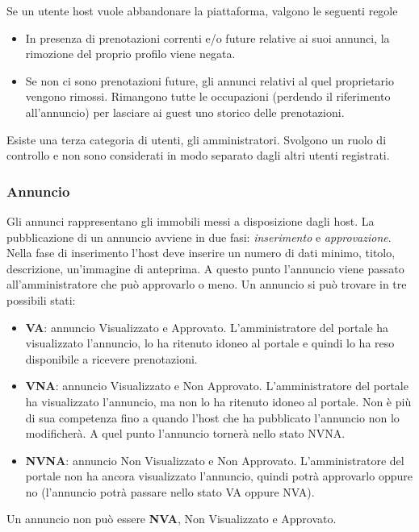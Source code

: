 \documentclass[1_relazione.tex]{subfiles}
\begin{document}
Se un utente host vuole abbandonare la piattaforma, valgono le seguenti regole 
\begin{itemize}
\item In presenza di prenotazioni correnti e/o future relative ai suoi annunci, la rimozione del proprio profilo viene negata.
\item Se non ci sono prenotazioni future, gli annunci relativi al quel proprietario vengono rimossi. Rimangono tutte le occupazioni (perdendo il riferimento all'annuncio) per lasciare ai guest uno storico delle prenotazioni.
\end{itemize}

Esiste una terza categoria di utenti, gli amministratori. Svolgono un ruolo di controllo e non sono considerati in modo separato dagli altri utenti registrati.  \\

\subsubsection{Annuncio} 
Gli annunci rappresentano gli immobili messi a disposizione dagli host. La pubblicazione di un annuncio avviene in due fasi: \textit{inserimento} e \textit{approvazione}.
Nella fase di inserimento l'host deve inserire un numero di dati minimo, titolo, descrizione, un'immagine di anteprima. A questo punto l'annuncio viene passato all'amministratore che può approvarlo o meno. Un annuncio si può trovare in tre possibili stati: 

\begin{itemize}
\item \textbf{VA}: annuncio Visualizzato e Approvato. L'amministratore del portale ha visualizzato l'annuncio, lo ha ritenuto idoneo al portale e quindi lo ha reso disponibile a ricevere prenotazioni.
\item \textbf{VNA}: annuncio Visualizzato e Non Approvato. L'amministratore del portale ha visualizzato l'annuncio, ma non lo ha ritenuto idoneo al portale. Non è più di sua competenza fino a quando l'host che ha pubblicato l'annuncio non lo modificherà. A quel punto l'annuncio tornerà nello stato NVNA.
\item \textbf{NVNA}: annuncio Non Visualizzato e Non Approvato. L'amministratore del portale non ha ancora visualizzato l'annuncio, quindi potrà approvarlo oppure no (l'annuncio potrà passare nello stato VA oppure NVA).
\end{itemize}
Un annuncio non può essere \textbf{NVA},  Non Visualizzato e Approvato. 
\end{document}
